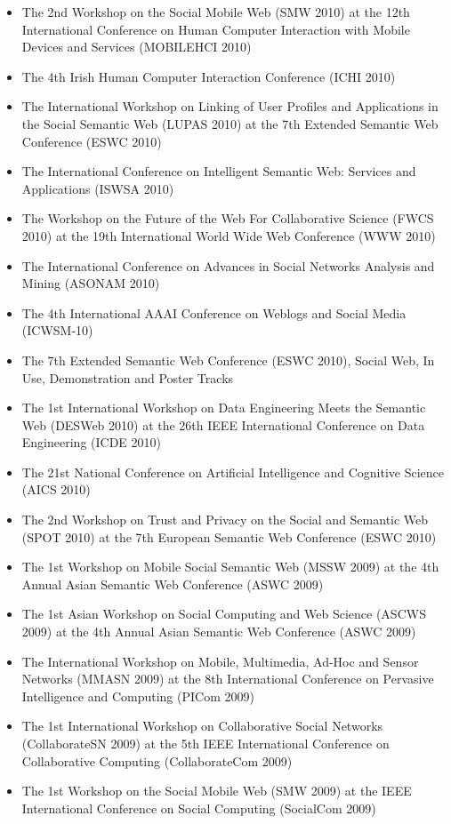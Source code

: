 \documentclass[10pt,a4paper]{res} %
\begin{document}
\begin{resume}
\begin{itemize}
\item The 2nd Workshop on the Social Mobile Web (SMW 2010) at the 12th International Conference on Human Computer Interaction with Mobile Devices and Services (MOBILEHCI 2010)
\item The 4th Irish Human Computer Interaction Conference (ICHI 2010)
\item The International Workshop on Linking of User Profiles and Applications in the Social Semantic Web (LUPAS 2010) at the 7th Extended Semantic Web Conference (ESWC 2010)
\item The International Conference on Intelligent Semantic Web: Services and Applications (ISWSA 2010)
\item The Workshop on the Future of the Web For Collaborative Science (FWCS 2010) at the 19th International World Wide Web Conference (WWW 2010)
\item The International Conference on Advances in Social Networks Analysis and Mining (ASONAM 2010)
\item The 4th International AAAI Conference on Weblogs and Social Media (ICWSM-10)
\item The 7th Extended Semantic Web Conference (ESWC 2010), Social Web, In Use, Demonstration and Poster Tracks
\item The 1st International Workshop on Data Engineering Meets the Semantic Web (DESWeb 2010) at the 26th IEEE International Conference on Data Engineering (ICDE 2010)
\item The 21st National Conference on Artificial Intelligence and Cognitive Science (AICS 2010)
\item The 2nd Workshop on Trust and Privacy on the Social and Semantic Web (SPOT 2010) at the 7th European Semantic Web Conference (ESWC 2010)
\item The 1st Workshop on Mobile Social Semantic Web (MSSW 2009) at the 4th Annual Asian Semantic Web Conference (ASWC 2009)
\item The 1st Asian Workshop on Social Computing and Web Science (ASCWS 2009) at the 4th Annual Asian Semantic Web Conference (ASWC 2009)
\item The International Workshop on Mobile, Multimedia, Ad-Hoc and Sensor Networks (MMASN 2009) at the 8th International Conference on Pervasive Intelligence and Computing (PICom 2009)
\item The 1st International Workshop on Collaborative Social Networks (CollaborateSN 2009) at the 5th IEEE International Conference on Collaborative Computing (CollaborateCom 2009)
\item The 1st Workshop on the Social Mobile Web (SMW 2009) at the IEEE International Conference on Social Computing (SocialCom 2009)

\end{itemize}
\end{resume}
\end{document}
